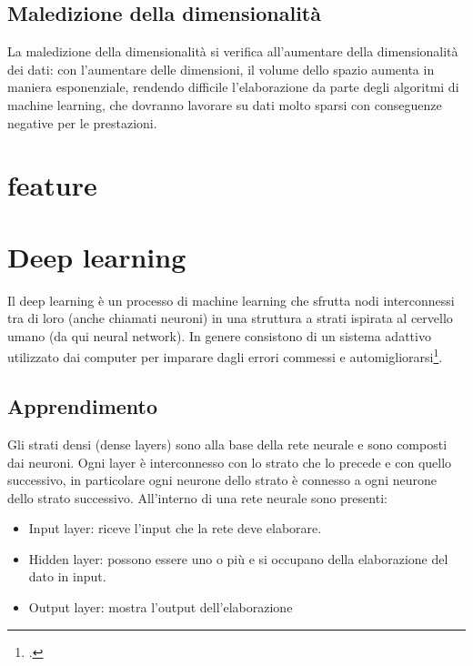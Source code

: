 \subsection{Maledizione della dimensionalità}
La maledizione della dimensionalità si verifica all'aumentare della dimensionalità dei dati: con l'aumentare delle dimensioni, il volume dello spazio aumenta in maniera esponenziale, rendendo difficile l'elaborazione da parte degli algoritmi di machine learning, che dovranno lavorare su dati molto sparsi con conseguenze negative per le prestazioni.

\section{feature}

\section{Deep learning}
Il deep learning è un processo di machine learning che sfrutta nodi interconnessi tra di loro (anche chiamati neuroni) in una struttura a strati ispirata al cervello umano (da qui neural network).
In genere consistono di un sistema adattivo utilizzato dai computer per imparare dagli errori commessi e automigliorarsi\footcite{site:rete-neurale}.

\subsection{Apprendimento}
Gli strati densi (dense layers) sono alla base della rete neurale e sono composti dai neuroni.
Ogni layer è interconnesso con lo strato che lo precede e con quello successivo, in particolare ogni neurone dello strato è connesso a ogni neurone dello strato successivo.
All'interno di una rete neurale sono presenti:
\begin{itemize}
    \item Input layer: riceve l'input che la rete deve elaborare.
    \item Hidden layer: possono essere uno o più e si occupano della elaborazione del dato in input.
    \item Output layer: mostra l'output dell'elaborazione
\end{itemize}
